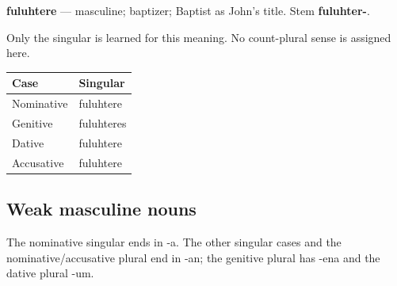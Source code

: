 \par\begin{minipage}{\linewidth}\raggedright
\textbf{fuluhtere} — masculine; baptizer; Baptist as John’s title. Stem \textbf{fuluhter-}.

Only the singular is learned for this meaning. No count-plural sense is assigned here.

\par\begingroup
\fontsize{10.5}{13.2}\selectfont
\setlength{\LTleft}{0pt}\setlength{\LTright}{\fill}
\noindent
\begin{tabular}{@{}>{\raggedright\arraybackslash}p{60.59mm}>{\raggedright\arraybackslash}p{60.59mm}@{}}
\toprule
\textbf{Case} & \textbf{Singular} \\
\midrule
Nominative & fuluhtere \\
Genitive & fuluhteres \\
Dative & fuluhtere \\
Accusative & fuluhtere \\
\bottomrule
\end{tabular}
\par\endgroup

\end{minipage}\par
{}
\subsection*{Weak masculine nouns}

The nominative singular ends in -a. The other singular cases and the nominative/\allowbreak{}accusative plural end in -an; the genitive plural has -ena and the dative plural -um.

